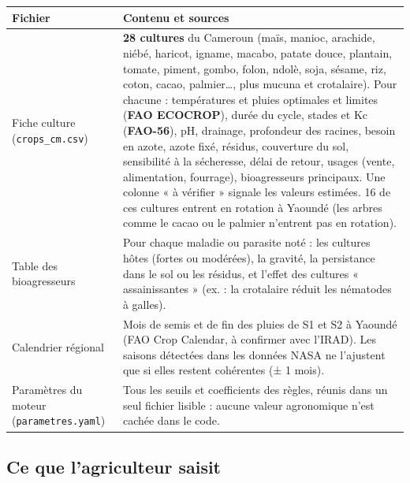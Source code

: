\documentclass[11pt,a4paper]{article}
\begin{document}
\begin{center}
\begin{tabularx}{\textwidth}{L{3.8cm}Y}
\toprule
\textbf{Fichier} & \textbf{Contenu et sources} \\
\midrule
Fiche culture (\texttt{crops\_cm.csv}) & \textbf{28 cultures} du Cameroun (maïs, manioc, arachide, niébé, haricot, igname, macabo, patate douce, plantain, tomate, piment, gombo, folon, ndolè, soja, sésame, riz, coton, cacao, palmier…, plus mucuna et crotalaire). Pour chacune : températures et pluies optimales et limites (\textbf{FAO ECOCROP}), durée du cycle, stades et Kc (\textbf{FAO-56}), pH, drainage, profondeur des racines, besoin en azote, azote fixé, résidus, couverture du sol, sensibilité à la sécheresse, délai de retour, usages (vente, alimentation, fourrage), bioagresseurs principaux. Une colonne « à vérifier » signale les valeurs estimées. 16 de ces cultures entrent en rotation à Yaoundé (les arbres comme le cacao ou le palmier n'entrent pas en rotation). \\
Table des bioagresseurs & Pour chaque maladie ou parasite noté : les cultures hôtes (fortes ou modérées), la gravité, la persistance dans le sol ou les résidus, et l'effet des cultures « assainissantes » (ex. : la crotalaire réduit les nématodes à galles). \\
Calendrier régional & Mois de semis et de fin des pluies de S1 et S2 à Yaoundé (FAO Crop Calendar, à confirmer avec l'IRAD). Les saisons détectées dans les données NASA ne l'ajustent que si elles restent cohérentes (± 1 mois). \\
Paramètres du moteur (\texttt{parametres.yaml}) & Tous les seuils et coefficients des règles, réunis dans un seul fichier lisible : aucune valeur agronomique n'est cachée dans le code. \\
\bottomrule
\end{tabularx}
\end{center}

\subsection{Ce que l'agriculteur saisit}
\end{document}
